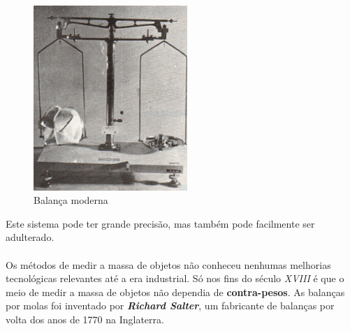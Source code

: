 \begin{minipage}[!b]{0.45\linewidth}
	\begin{figure}[H]
		\centering
		\includegraphics[height=7cm]{./image/PESTA/general/balanca_4.jpg}
		\caption{Balança moderna \cite{book_7}}
		\label{balanca_4}
	\end{figure}
\end{minipage}
\newline
\newline
\newline
Este sistema pode ter grande precisão, mas também pode facilmente ser adulterado.
\\
\\
Os métodos de medir a massa de objetos não conheceu nenhumas melhorias tecnológicas relevantes até a era industrial. Só nos fins do século \textit{XVIII} é que o meio de medir a massa de objetos não dependia de \textbf{contra-pesos}. As balanças por molas foi inventado por \textbf{\textit{Richard Salter}}, um fabricante de balanças por volta dos anos de 1770 na Inglaterra.\\
